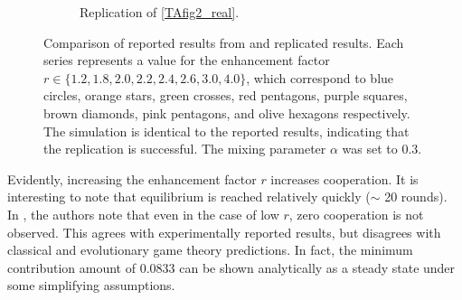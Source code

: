 \begin{figure}[!h]
\begin{subfigure}[b]{0.45\textwidth}
    \caption{Replication of \ref{TAfig2_real}. }
    \label{TAfig2}
  \end{subfigure}
  \caption{Comparison of reported results from \cite{RN49} and replicated results. Each series represents a value for the enhancement factor $r \in \{1.2, 1.8, 2.0, 2.2, 2.4, 2.6, 3.0, 4.0\}$, which correspond to blue circles, orange stars, green crosses, red pentagons, purple squares, brown diamonds, pink pentagons, and olive hexagons respectively. The simulation is identical to the reported results, indicating that the replication is successful. The mixing parameter $\alpha$ was set to 0.3.} \label{comp0}
\end{figure} 
\FloatBarrier

Evidently, increasing the enhancement factor $r$ increases cooperation. It is interesting to note that equilibrium is reached relatively quickly ($\sim$ 20 rounds). In \cite{RN49}, the authors note that even in the case of low $r$, zero cooperation is not observed. This agrees with experimentally reported results, but disagrees with classical and evolutionary game theory predictions. In fact, the minimum contribution amount of 0.0833 can be shown analytically as a steady state under some simplifying assumptions.\\


